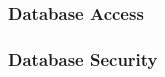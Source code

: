 \documentclass{article}
\begin{document}
\subsubsection{Database Access}
\label{da}

\subsubsection{Database Security}
\label{ds}

\end{document}
